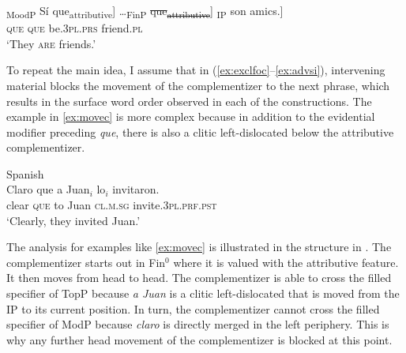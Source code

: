 				\gll {\ob}\textsubscript{MoodP} Sí que\textsubscript{attributive}] \dots  {\ob}\textsubscript{FinP} \sout{que\textsubscript{attributive}}] {\ob}\textsubscript{IP} son amics.] \\
		{}	\textsc{} \textsc{que} {}  \textsc{que} {}  be.\textsc{3pl.prs} friend.\textsc{pl}\\
		\glt `They \textsc{are} friends.'
	\z
\z

To repeat the main idea, I assume that in (\ref{ex:exclfoc}--\ref{ex:advsi}), intervening material blocks the movement of the complementizer to the next phrase, which results in the surface word order observed in each of the constructions. The example in \eqref{ex:movec} is more complex because in addition to the evidential modifier preceding \emph{que}, there is also a clitic left-dislocated  below the attributive complementizer.

\ea\label{ex:movec}
Spanish\\
\gll  Claro que a Juan$_i$ lo$_i$ invitaron. \\
	clear \textsc{que} to Juan \textsc{cl.m.sg} invite.\textsc{3pl.prf.pst}\\
	\glt `Clearly, they invited Juan.'
\z

The analysis for examples like \eqref{ex:movec} is illustrated in the structure in . The complementizer starts out in Fin$^0$ where it is valued with the attributive feature. It then moves from head to head. The complementizer is able to cross the filled specifier of TopP because \emph{a Juan} is a clitic left-dislocated  that is moved from the IP to its current position. In turn, the complementizer cannot cross the filled specifier of  ModP because \emph{claro} is directly merged in the left periphery. This is why  any further head movement of the complementizer is blocked at this point.

